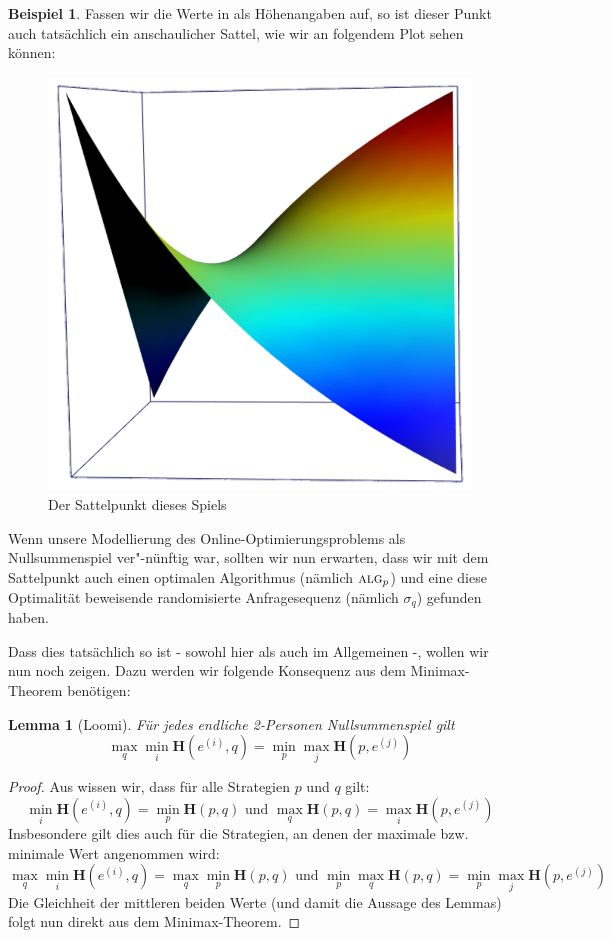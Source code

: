 \documentclass[a4paper,ngerman,12pt,bibtotoc]{scrartcl}
\theoremstyle{definition}
\newtheorem{bsp}[defn]{Beispiel}
\theoremstyle{plain}
\newtheorem{lemma}[defn]{Lemma}
\theoremstyle{remark}
\renewcommand{\_}{\mathpunct{.}\,}
\newcommand{\?}{\,{:}\,}
\newcommand{\Alg}{\ensuremath{\textsc{alg}}}
\newcommand{\EH}{\boldsymbol{H}}
\begin{document}
\begin{bsp}
		Fassen wir die Werte in  als Höhenangaben auf, so ist dieser Punkt auch tatsächlich ein \glqq anschaulicher\grqq{} Sattel, wie wir an folgendem Plot sehen können:		
		\begin{figure}[h]
			\centering
			\includegraphics[width=0.45\linewidth]{../Bilder/Rplot05}
			\caption{\small Der Sattelpunkt dieses Spiels}
			\label{fig:Rplot05}
		\end{figure} 
	\end{bsp}
	
	Wenn unsere Modellierung des Online-Optimierungsproblems als Nullsummenspiel \glqq ver"-nünftig\grqq{} war, sollten wir nun erwarten, dass wir mit dem Sattelpunkt auch einen optimalen Algorithmus (nämlich $\Alg_p$) und eine diese Optimalität beweisende randomisierte Anfragesequenz (nämlich $\sigma_q$) gefunden haben. 
	
	Dass dies tatsächlich so ist - sowohl hier als auch im Allgemeinen -, wollen wir nun noch zeigen. Dazu werden wir folgende Konsequenz aus dem Minimax-Theorem benötigen:
	
	\begin{lemma}[Loomi]\label{lemma:Loomi}
		Für jedes endliche 2-Personen Nullsummenspiel gilt
		\[\max_q\min_i\EH(e^{(i)},q) = \min_p\max_j\EH(p,e^{(j)})\]
	\end{lemma}
	
	\begin{proof}
		Aus  wissen wir, dass für alle Strategien $p$ und $q$ gilt:
			\[\min_i \EH(e^{(i)},q) = \min_p\EH(p,q) \text{ und } \max_q\EH(p,q) = \max_i \EH(p,e^{(j)})\]
		Insbesondere gilt dies auch für die Strategien, an denen der maximale bzw. minimale Wert angenommen wird:
			\[\max_q\min_i \EH(e^{(i)},q) = \max_q\min_p\EH(p,q) \text{ und } \min_p\max_q\EH(p,q) = \min_p\max_j \EH(p,e^{(j)})\]
		Die Gleichheit der mittleren beiden Werte (und damit die Aussage des Lemmas) folgt nun direkt aus dem Minimax-Theorem.
	\end{proof}
	
\end{document}
